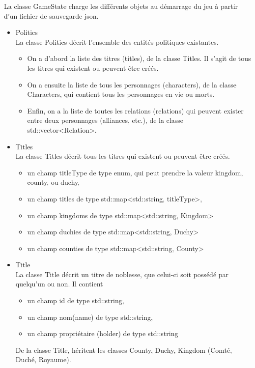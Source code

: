 \documentclass[a4paper,12pt]{article}
\begin{document}
La classe GameState charge les différents objets au démarrage du jeu à partir d'un fichier de sauvegarde json.\\

\begin{itemize}
\item Politics\\
La classe Politics décrit l'ensemble des entités politiques existantes. 
\begin{itemize}
\item On a d'abord la liste des titres (titles), de la classe Titles. Il s'agit de tous les titres qui existent ou peuvent être créés. 
\item On a ensuite la liste de tous les personnages (characters), de la classe Characters, qui contient tous les personnages en vie ou morts. 
\item Enfin, on a la liste de toutes les relations (relations) qui peuvent exister entre deux personnages (alliances, etc.), de la classe std::vector<Relation>. \\
\end{itemize}

\item Titles\\
La classe Titles décrit tous les titres qui existent ou peuvent être créés.
\begin{itemize}
\item un champ titleType de type enum, qui peut prendre la valeur kingdom, county, ou duchy,
\item un champ titles de type std::map<std::string, titleType>,
\item un champ kingdoms de type std::map<std::string, Kingdom>
\item un champ duchies de type std::map<std::string, Duchy>
\item un champ counties de type std::map<std::string, County>
\end{itemize}
\item Title\\
La classe Title décrit un titre de noblesse, que celui-ci soit possédé par quelqu'un ou non. Il contient
\begin{itemize}
\item un champ id de type std::string,
\item un champ nom(name) de type std::string,
\item un champ propriétaire (holder) de type std::string
\end{itemize}
De la classe Title, héritent les classes County, Duchy, Kingdom (Comté, Duché, Royaume). 


\end{itemize}
\end{document}
